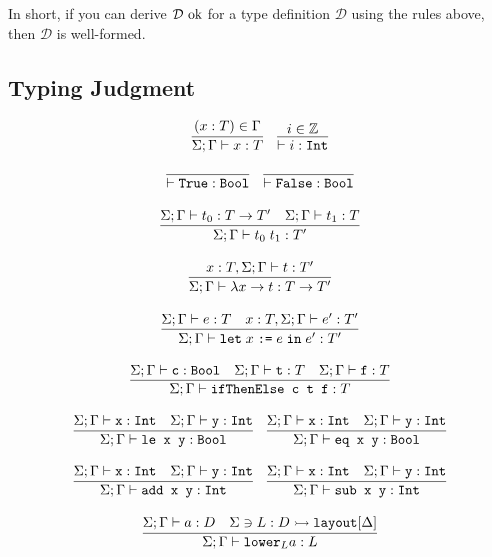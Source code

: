 \documentclass[10pt]{article}
\begin{document}
\noindent
In short, if you can derive $\mathcal{D}\textnormal{ ok}$ for a type definition $\mathcal{D}$ using the rules above, then $\mathcal{D}$ is well-formed.

\subsection{Typing Judgment}

\[
  \begin{array}{c}
    \infer{\Sigma ; \Gamma \vdash x : T}{(x : T) \in \Gamma}
    ~~~
    \infer{\vdash i : \ttt{Int}}{i \in \mathbb{Z}}
    \\\\
    \infer{\vdash \ttt{True} : \ttt{Bool}}{}
    ~~~
    \infer{\vdash \ttt{False} : \ttt{Bool}}{}
    \\\\
    \infer{\Sigma ; \Gamma \vdash t_0\; t_1 : T'}{\Sigma ; \Gamma \vdash t_0 : T \ra T' & \Sigma ; \Gamma \vdash t_1 : T}
    \\\\
    \infer{\Sigma ; \Gamma \vdash \lambda x \ra t : T \ra T'}{x : T, \Sigma ; \Gamma \vdash t : T'}
    \\\\
    \infer{\Sigma ; \Gamma \vdash \letbnd\; x\; \ttt{:=}\; e\; \inexpr\; e' : T'}{\Sigma ; \Gamma \vdash e : T & x : T, \Sigma ; \Gamma \vdash e' : T'}
    \\\\
    \infer{\Sigma ; \Gamma \vdash \ttt{ifThenElse c t f} : T}{\Sigma ; \Gamma \vdash \ttt{c} : \Bool & \Sigma ; \Gamma \vdash \ttt{t} : T & \Sigma ; \Gamma \vdash \ttt{f} : T}
    \\\\
    \infer{\Sigma ; \Gamma \vdash \ttt{le x y} : \Bool}{\Sigma ; \Gamma \vdash \ttt{x} : \Int & \Sigma ; \Gamma \vdash \ttt{y} : \Int}
    ~~~
    \infer{\Sigma ; \Gamma \vdash \ttt{eq x y} : \Bool}{\Sigma ; \Gamma \vdash \ttt{x} : \Int & \Sigma ; \Gamma \vdash \ttt{y} : \Int}
    \\\\
    \infer{\Sigma ; \Gamma \vdash \ttt{add x y} : \Int}{\Sigma ; \Gamma \vdash \ttt{x} : \Int & \Sigma ; \Gamma \vdash \ttt{y} : \Int}
    ~~~
    \infer{\Sigma ; \Gamma \vdash \ttt{sub x y} : \Int}{\Sigma ; \Gamma \vdash \ttt{x} : \Int & \Sigma ; \Gamma \vdash \ttt{y} : \Int}
    \\\\
    \infer{\Sigma ; \Gamma \vdash \lowerS{L} a : L}{\Sigma ; \Gamma \vdash a : D & \Sigma \ni L : D \hra \ttt{layout}[\Delta]}

\end{array}\]
\end{document}

